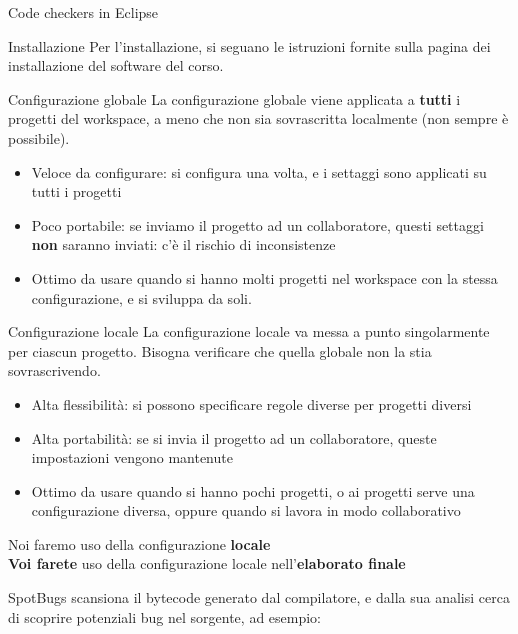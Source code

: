 \documentclass[presentation]{beamer}
\begin{document}
\begin{frame}[allowframebreaks]{Code checkers in Eclipse}
	\begin{block}{Installazione}
		Per l'installazione, si seguano le istruzioni fornite sulla pagina dei installazione del software del corso.
	\end{block}
	\begin{block}{Configurazione globale}
	La configurazione globale viene applicata a \textbf{tutti} i progetti del workspace, a meno che non sia sovrascritta localmente (non sempre è possibile).
		\begin{itemize}
			\item Veloce da configurare: si configura una volta, e i settaggi sono applicati su tutti i progetti
			\item Poco portabile: se inviamo il progetto ad un collaboratore, questi settaggi \textbf{non} saranno inviati: c'è il rischio di inconsistenze
			\item Ottimo da usare quando si hanno molti progetti nel workspace con la stessa configurazione, e si sviluppa da soli.
		\end{itemize}
	\end{block}
	\begin{block}{Configurazione locale}
	La configurazione locale va messa a punto singolarmente per ciascun progetto. Bisogna verificare che quella globale non la stia sovrascrivendo.
		\begin{itemize}
			\item Alta flessibilità: si possono specificare regole diverse per progetti diversi
			\item Alta portabilità: se si invia il progetto ad un collaboratore, queste impostazioni
vengono mantenute
			\item Ottimo da usare quando si hanno pochi progetti, o ai progetti serve una configurazione diversa, oppure quando si lavora in modo collaborativo
		\end{itemize}
	\end{block}
	\begin{center}
		Noi faremo uso della configurazione \textbf{locale} \\
		\textbf{Voi farete} uso della configurazione locale nell'\textbf{elaborato finale}
	\end{center}
\end{frame}

 {
   {
      SpotBugs scansiona il bytecode generato dal compilatore, e dalla sua analisi cerca di scoprire potenziali bug nel sorgente, ad esempio:
  }
}
\end{document}
